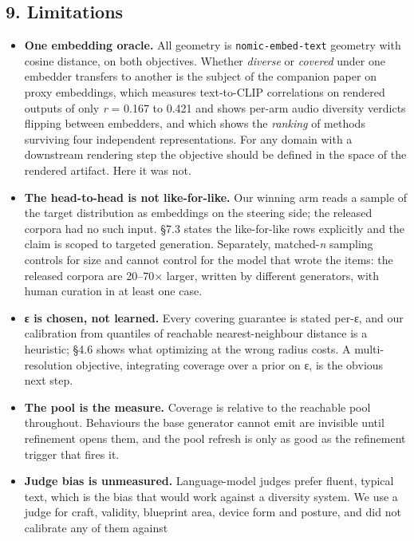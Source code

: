 \documentclass[
  10pt,
]{article}
\providecommand{\tightlist}{%
  \setlength{\itemsep}{0pt}\setlength{\parskip}{0pt}}
\theoremstyle{plain}
\theoremstyle{definition}
\providecommand{\tightlist}{\setlength{\itemsep}{0pt}\setlength{\parskip}{0pt}}
\begin{document}
\subsection{9. Limitations}\label{9-limitations}

\begin{itemize}
\tightlist
\item
  \textbf{One embedding oracle.} All geometry is
  \texttt{nomic-embed-text} geometry with cosine distance, on both
  objectives. Whether \emph{diverse} or \emph{covered} under one
  embedder transfers to another is the subject of the companion paper on
  proxy embeddings, which measures text-to-CLIP correlations on rendered
  outputs of only \emph{r} = 0.167 to 0.421 and shows per-arm audio
  diversity verdicts flipping between embedders, and which shows the
  \emph{ranking} of methods surviving four independent representations.
  For any domain with a downstream rendering step the objective should
  be defined in the space of the rendered artifact. Here it was not.
\item
  \textbf{The head-to-head is not like-for-like.} Our winning arm reads
  a sample of the target distribution as embeddings on the steering
  side; the released corpora had no such input. §7.3 states the
  like-for-like rows explicitly and the claim is scoped to targeted
  generation. Separately, matched-\emph{n} sampling controls for size
  and cannot control for the model that wrote the items: the released
  corpora are 20--70× larger, written by different generators, with
  human curation in at least one case.
\item
  \textbf{ε is chosen, not learned.} Every covering guarantee is stated
  per-ε, and our calibration from quantiles of reachable
  nearest-neighbour distance is a heuristic; §4.6 shows what optimizing
  at the wrong radius costs. A multi-resolution objective, integrating
  coverage over a prior on ε, is the obvious next step.
\item
  \textbf{The pool is the measure.} Coverage is relative to the
  reachable pool throughout. Behaviours the base generator cannot emit
  are invisible until refinement opens them, and the pool refresh is
  only as good as the refinement trigger that fires it.
\item
  \textbf{Judge bias is unmeasured.} Language-model judges prefer
  fluent, typical text, which is the bias that would work against a
  diversity system. We use a judge for craft, validity, blueprint area,
  device form and posture, and did not calibrate any of them against

\end{itemize}
\end{document}
